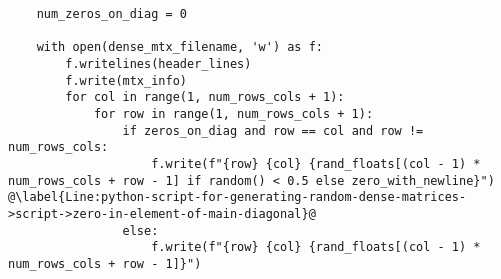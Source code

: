 \begin{lstlisting}
	num_zeros_on_diag = 0
	
	with open(dense_mtx_filename, 'w') as f:
		f.writelines(header_lines)
		f.write(mtx_info)
		for col in range(1, num_rows_cols + 1):
			for row in range(1, num_rows_cols + 1):
				if zeros_on_diag and row == col and row != num_rows_cols:
					f.write(f"{row} {col} {rand_floats[(col - 1) * num_rows_cols + row - 1] if random() < 0.5 else zero_with_newline}") @\label{Line:python-script-for-generating-random-dense-matrices->script->zero-in-element-of-main-diagonal}@
				else:
					f.write(f"{row} {col} {rand_floats[(col - 1) * num_rows_cols + row - 1]}")
\end{lstlisting}